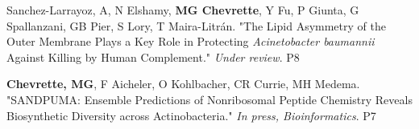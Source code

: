 \begin{cvpubs}


    


  \cvpub
    {Sanchez-Larrayoz, A, N Elshamy, \textbf{MG Chevrette}, Y Fu, P Giunta, G Spallanzani, GB Pier, S Lory, T Maira-Litr\'{a}n. "The Lipid Asymmetry of the Outer Membrane Plays a Key Role in Protecting \textit{Acinetobacter baumannii} Against Killing by Human Complement." \textit{Under review}.} %
    {P8} %

  \cvpub
    {\textbf{Chevrette, MG}, F Aicheler, O Kohlbacher, CR Currie, MH Medema. "SANDPUMA: Ensemble Predictions of Nonribosomal Peptide Chemistry Reveals Biosynthetic Diversity across Actinobacteria." \textit{In press, Bioinformatics}. } %
    {P7} %
    

\end{cvpubs}
